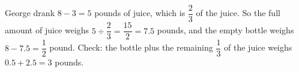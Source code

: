 George drank $8-3=5$ pounds of juice, which is $\dfrac{2}{3}$ of the juice. So the full amount of juice weighs $5\div\dfrac{2}{3}=\dfrac{15}{2}=7.5$ pounds, and the empty bottle weighs $8-7.5=\boxed{\dfrac{1}{2}}$ pound. Check: the bottle plus the remaining $\dfrac{1}{3}$ of the juice weighs $0.5+2.5=3$ pounds.
